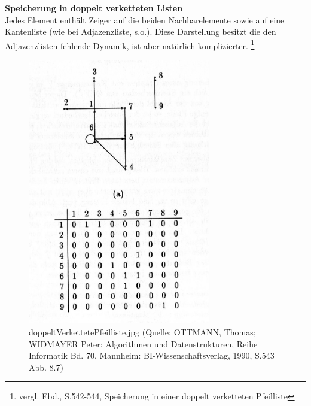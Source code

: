 \textbf{Speicherung in doppelt verketteten Listen}\\
Jedes Element enthält Zeiger auf die beiden Nachbarelemente sowie auf eine Kantenliste (wie bei Adjazenzliste, s.o.).
Diese Darstellung besitzt die den Adjazenzlisten fehlende Dynamik, ist aber natürlich komplizierter.
 \footnote{vergl. Ebd., S.542-544, Speicherung in einer doppelt verketteten Pfeilliste}
 
\begin{figure}[h]
\centering
\includegraphics[width = 8cm, bb=0 0 300 400]{./chapters/adjazenzmatrix.jpg}
\caption{doppeltVerkettetePfeilliste.jpg {\tiny (Quelle: OTTMANN, Thomas; WIDMAYER Peter: Algorithmen und Datenstrukturen, Reihe Informatik Bd. 70, Mannheim: BI-Wissenschaftsverlag, 1990, S.543 Abb. 8.7)} }
\label{a4}
\end{figure}


